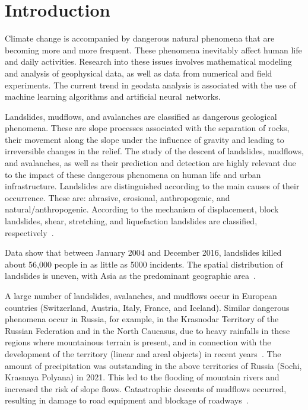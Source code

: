 \documentclass[mathematics,article,accept,pdftex,moreauthors]{Definitions/mdpi}
\begin{document}
\section{Introduction}

Climate change is accompanied by dangerous natural phenomena that are becoming more and more frequent. These phenomena inevitably affect human life and daily activities.  Research into these issues involves mathematical modeling and analysis of geophysical data, as well as data from numerical and field experiments. The current trend in geodata analysis is associated with the use of machine learning algorithms and artificial neural~networks.

Landslides, mudflows, and avalanches are classified as dangerous geological phenomena. These are slope processes associated with the separation of rocks, their movement along the slope under the influence of gravity and leading to irreversible changes in the relief. The study of the descent of landslides, mudflows, and avalanches, as well as their prediction and detection are highly relevant due to the impact of these dangerous phenomena on human life and urban infrastructure. Landslides are distinguished according to the main causes of their occurrence. These are: abrasive, erosional, anthropogenic, and natural/anthropogenic. According to the mechanism of displacement, block landslides, shear, stretching, and liquefaction landslides are classified, respectively~\cite{Pendin2015}.

Data show that between January 2004 and December 2016, landslides killed about 56,000 people in as little as 5000 
 incidents. The spatial distribution of landslides is uneven, with Asia as the predominant geographic area~\cite{Froude2018}.

A large number of landslides, avalanches, and mudflows occur in European countries (Switzerland, Austria, Italy, France, and Iceland). Similar dangerous phenomena occur in Russia, for example, in the Krasnodar Territory of the Russian Federation and in  the North Caucasus, due to heavy rainfalls in these regions where mountainous terrain is present, and in connection with the development of the territory (linear and areal objects) in recent years~\cite{hungr2005landslide}.  The amount of precipitation was outstanding in the above territories of Russia (Sochi, Krasnaya Polyana) in 2021. This led to the flooding of mountain rivers and increased the risk of slope flows. Catastrophic descents of mudflows occurred, resulting in damage to road equipment and blockage of roadways~\cite{Harch2020}.
\end{document}
